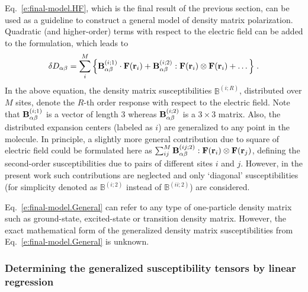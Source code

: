 \documentclass[aip,jcp,preprint,amsmath,amssymb,floatfix]{revtex4-1}
\begin{document}
Eq.~\eqref{e:final-model.HF}, which is the final result of the previous section, 
can be used as a guideline to construct a general model of density matrix polarization.
Quadratic (and higher\hyp{}order) terms with respect to the electric field
can be added to the formulation, which leads to
%
\begin{equation}\label{e:final-model.General}
 \delta D_{\alpha\beta} = \sum_{i }^M \Big\{
                                      {\bf B}^{(i ; 1)}_{\alpha\beta} \cdot {\bf F}({\bf r}_i)  %
                        +             {\bf B}^{(i ; 2)}_{\alpha\beta} : {\bf F}({\bf r}_i) \otimes {\bf F}({\bf r}_i) 
                        + \ldots \Big\} \;.
\end{equation}
%
In the above equation, the density matrix susceptibilities
$\mathbb{B}^{(i; R)}$, distributed over $M$ sites,
denote the $R$-th order response with respect to the electric field.
Note that
${\bf B}^{(i; 1)}_{\alpha\beta}$ is a vector of length $3$ whereas ${\bf B}^{(i; 2)}_{\alpha\beta}$
is a $3\times 3$ matrix. Also, the distributed expansion centers
(labeled as $i$) are generalized to any point in the molecule.
In principle, a slightly more general
contribution due to square of electric field could 
be formulated here as $\sum_{ij}^M {\bf B}^{(ij; 2)}_{\alpha\beta} : {\bf F}({\bf r}_i) \otimes {\bf F}({\bf r}_j)$,
defining the second\hyp{}order susceptibilities due to pairs of different sites $i$ and $j$. 
However, in the present work such contributions are neglected and only `diagonal' susceptibilities
(for simplicity denoted as $\mathbb{B}^{(i; 2)}$ instead of $\mathbb{B}^{(ii; 2)}$) are considered.

Eq.~\eqref{e:final-model.General} can refer to any type of one\hyp{}particle density matrix
such as ground\hyp{}state, excited\hyp{}state or transition density matrix.
However, the exact mathematical form of the generalized density matrix susceptibilities 
from Eq.~\eqref{e:final-model.General} is unknown. 

\subsubsection{Determining the generalized susceptibility tensors by linear regression}
\end{document}
